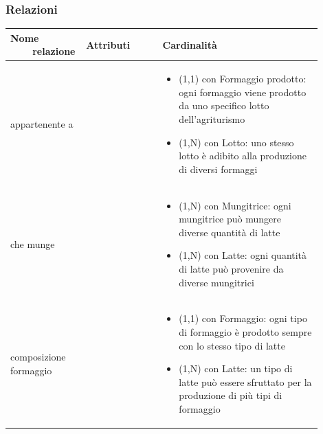 \documentclass[12pt,a4paper]{article}
\begin{document}
\subsubsection{Relazioni}
\label{Produzione Relazioni}
\begin{center}

\setlength{\extrarowheight}{1.5pt}

\begin{longtable}{|p{0.16\linewidth}|p{0.24\linewidth}|p{0.50\linewidth}|}
\hline 
\textbf{Nome \ \ \ \ relazione} 	& \textbf{Attributi} & \textbf{Cardinalità}\\ 

    
\hline
appartenente a 				& \begin{flushleft}\vspace{-15pt}  \end{flushleft}
					& \begin{itemize}
						\setlength{\itemindent}{-1em}
						\vspace{-25pt}
						\setlength\itemsep{-0.25em}
						\item (1,1) con Formaggio prodotto: ogni formaggio viene prodotto da uno specifico lotto dell'agriturismo
						\item (1,N) con Lotto: uno stesso lotto è adibito alla produzione di diversi formaggi
					\end{itemize}\\ 

\hline
che munge 				& \begin{flushleft}\vspace{-15pt}  \end{flushleft}
					& \begin{itemize}
						\setlength{\itemindent}{-1em}
						\vspace{-25pt}
						\setlength\itemsep{-0.25em}
						\item (1,N) con Mungitrice: ogni mungitrice può mungere diverse quantità di latte
						\item (1,N) con Latte: ogni quantità di latte può provenire da diverse mungitrici
					\end{itemize}\\ 

\hline
composizione formaggio 				& \begin{flushleft}\vspace{-15pt}  \end{flushleft}
					& \begin{itemize}
						\setlength{\itemindent}{-1em}
						\vspace{-25pt}
						\setlength\itemsep{-0.25em}
						\item (1,1) con Formaggio: ogni tipo di formaggio è prodotto sempre con lo stesso tipo di latte
						\item (1,N) con Latte: un tipo di latte può essere sfruttato per la produzione di più tipi di formaggio
					\end{itemize}\\ 


\end{longtable}
\end{center}
\end{document}
